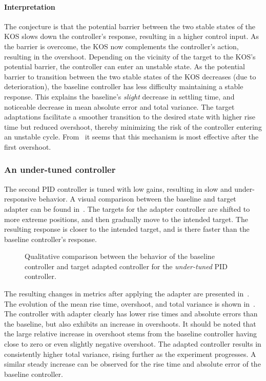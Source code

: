\paragraph*{Interpretation}
The conjecture is that the potential barrier between the two stable states of the KOS slows down the controller's response, resulting in a higher control input.
As the barrier is overcome, the KOS now complements the controller's action, resulting in the overshoot.
Depending on the vicinity of the target to the KOS's potential barrier, the controller can enter an unstable state.
As the potential barrier to transition between the two stable states of the KOS decreases (due to deterioration), the baseline controller has less difficulty maintaining a stable response.
This explains the baseline's \emph{slight} decrease in settling time, and noticeable decrease in mean absolute error and total variance.
The target adaptations facilitate a smoother transition to the desired state with higher rise time but reduced overshoot, thereby minimizing the risk of the controller entering an unstable cycle.
From~ it seems that this mechanism is most effective after the first overshoot.

\subsubsection{An under-tuned controller}
The second PID controller is tuned with low gains, resulting in slow and under-responsive behavior.
A visual comparison between the baseline and target adapter can be found in~.
The targets for the adapter controller are shifted to more extreme positions, and then gradually move to the intended target.
The resulting response is closer to the intended target, and is there faster than the baseline controller's response.

\begin{figure}
    \centering
    
    \vspace*{-2em}
    \caption{Qualitative comparison between the behavior of the baseline controller and target adapted controller for the \emph{under-tuned} PID controller.}
    \label{fig:under-tuned}
\end{figure}

The resulting changes in metrics after applying the adapter are presented in~.
The evolution of the mean rise time, overshoot, and total variance is shown in~.
The controller with adapter clearly has lower rise times and absolute errors than the baseline, but also exhibits an increase in overshoots.
It should be noted that the large relative increase in overshoot stems from the baseline controller having close to zero or even slightly negative overshoot.
The adapted controller results in consistently higher total variance, rising further as the experiment progresses.
A similar steady increase can be observed for the rise time and absolute error of the baseline controller.

